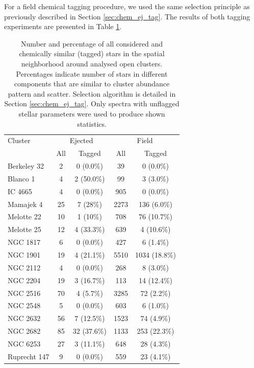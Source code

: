 For a field chemical tagging procedure, we used the same selection principle as previously described in Section \ref{sec:chem_ej_tag}. The results of both tagging experiments are presented in Table \ref{tab:cluster_stats_abundtag}.

\begin{table}
	\centering
	\caption{Number and percentage of all considered and chemically similar (tagged) stars in the spatial neighborhood around analysed open clusters. Percentages indicate number of stars in different components that are similar to cluster abundance pattern and scatter. Selection algorithm is detailed in Section \ref{sec:chem_ej_tag}. Only spectra with unflagged stellar parameters were used to produce shown statistics.}
	\begin{tabular}{l | c | c | c | c }
		\hline
		Cluster & \multicolumn{2}{c}{Ejected}  & \multicolumn{2}{c}{Field} \\
		 & All & Tagged & All & Tagged \\
		\hline
		Berkeley 32  & 2 & 0 (0.0\%) & 39 & 0 (0.0\%) \\ 
		Blanco 1     & 4 & 2 (50.0\%) & 99 & 3 (3.0\%) \\
		IC 4665      & 4 & 0 (0.0\%) & 905 & 0 (0.0\%) \\
		Mamajek 4    & 25 & 7 (28\%) & 2273 & 136 (6.0\%) \\
		Melotte 22   & 10 & 1 (10\%) & 708 & 76 (10.7\%) \\
		Melotte 25   & 12 & 4 (33.3\%) & 639 & 4 (10.6\%) \\
		NGC 1817     & 6 & 0 (0.0\%) & 427 & 6 (1.4\%) \\
		NGC 1901     & 19 & 4 (21.1\%) & 5510 & 1034 (18.8\%) \\
		NGC 2112     & 4 & 0 (0.0\%) & 268 & 8 (3.0\%) \\
		NGC 2204     & 19 & 3 (16.7\%) & 113 & 14 (12.4\%) \\
		NGC 2516     & 70 & 4 (5.7\%) & 3285 & 72 (2.2\%) \\
		NGC 2548     & 5 & 0 (0.0\%) & 603 & 6 (1.0\%) \\
		NGC 2632     & 56 & 7 (12.5\%) & 1523 & 74 (4.9\%) \\
		NGC 2682     & 85 & 32 (37.6\%) & 1133 & 253 (22.3\%) \\
		NGC 6253     & 27 & 3 (11.1\%) & 648 & 28 (4.3\%) \\
		Ruprecht 147 & 9 & 0 (0.0\%) & 559 & 23 (4.1\%) \\
		\hline
	\end{tabular}
	\label{tab:cluster_stats_abundtag}
\end{table}

